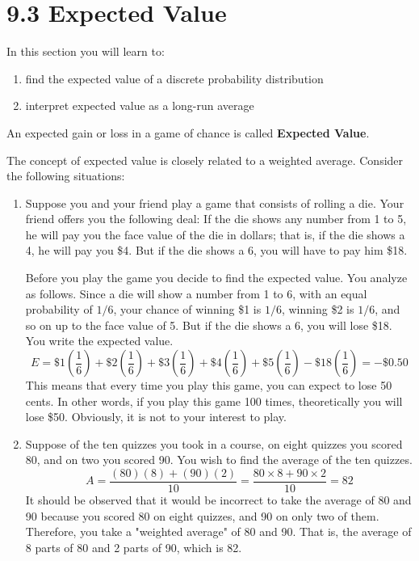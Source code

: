 \section{9.3 Expected Value}\label{section_expected_value}

In this section you will learn to:
\begin{enumerate}
    \item find the expected value of a discrete probability distribution
    \item interpret expected value as a long-run average
\end{enumerate}

\begin{definition}
    An expected gain or loss in a game of chance is called \textbf{Expected Value}.
\end{definition}
The concept of expected value is closely related to a weighted average. Consider the following situations:

\begin{enumerate}
    \item Suppose you and your friend play a game that consists of rolling a die. Your friend offers you the following deal: If the die shows any number from 1 to 5, he will pay you the face value of the die in dollars; that is, if the die shows a 4, he will pay you \$4. But if the die shows a 6, you will have to pay him \$18.

          Before you play the game you decide to find the expected value. You analyze as follows. Since a die will show a number from 1 to 6, with an equal probability of $1/6$, your chance of winning \$1 is $1/6$, winning \$2 is $1/6$, and so on up to the face value of 5. But if the die shows a 6, you will lose \$18. You write the expected value.
          \[
              E = \$1\left(\frac{1}{6}\right) + \$2\left(\frac{1}{6}\right) + \$3\left(\frac{1}{6}\right) + \$4\left(\frac{1}{6}\right) + \$5\left(\frac{1}{6}\right) - \$18\left(\frac{1}{6}\right) = -\$0.50
          \]
          This means that every time you play this game, you can expect to lose 50 cents. In other words, if you play this game 100 times, theoretically you will lose \$50. Obviously, it is not to your interest to play.

    \item Suppose of the ten quizzes you took in a course, on eight quizzes you scored 80, and on two you scored 90. You wish to find the average of the ten quizzes.
          \[
              A = \frac{(80)(8) + (90)(2)}{10} = \frac{80 \times 8 + 90 \times 2}{10} = 82
          \]
          It should be observed that it would be incorrect to take the average of 80 and 90 because you scored 80 on eight quizzes, and 90 on only two of them. Therefore, you take a "weighted average" of 80 and 90. That is, the average of 8 parts of 80 and 2 parts of 90, which is 82.
\end{enumerate}


